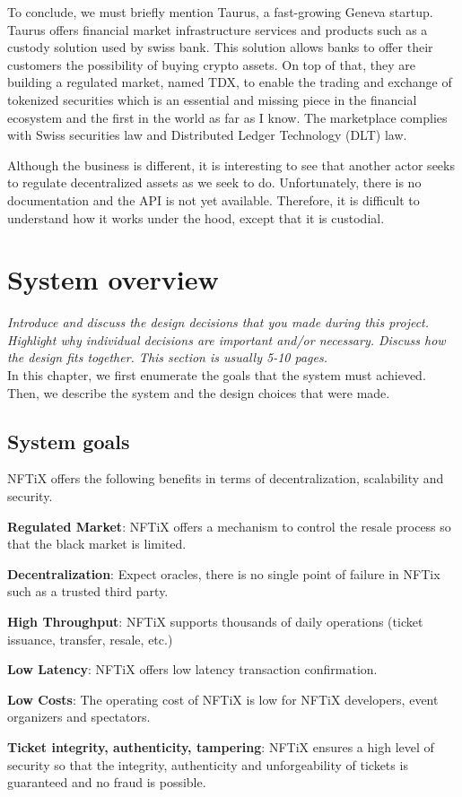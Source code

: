 \documentclass[a4paper,11pt,oneside]{report}
\begin{document}
To conclude, we must briefly mention Taurus, a fast-growing Geneva startup. Taurus offers financial market infrastructure services and products such as a custody solution used by swiss bank. This solution allows banks to offer their customers the possibility of buying crypto assets. On top of that, they are building a regulated market, named TDX, to enable the trading and exchange of tokenized securities which is an essential and missing piece in the financial ecosystem and the first in the world as far as I know. The marketplace complies with Swiss securities law and Distributed Ledger Technology (DLT) law.

Although the business is different, it is interesting to see that another actor seeks to regulate decentralized assets as we seek to do. Unfortunately, there is no documentation and the API is not yet available. Therefore, it is difficult to understand how it works under the hood, except that it is custodial.

\chapter{System overview}

\textit{Introduce and discuss the design decisions that you made during this project.
Highlight why individual decisions are important and/or necessary. Discuss
how the design fits together.
This section is usually 5-10 pages.} \\

In this chapter, we first enumerate the goals that the system must achieved. Then, we describe the system and the design choices that were made. 

\section{System goals}

NFTiX offers the following benefits in terms of decentralization, scalability and security.

\begin{description}
  \item \textbf{Regulated Market}: NFTiX offers a mechanism to control the resale process so that the black market is limited.
  \item \textbf{Decentralization}: Expect oracles, there is no single point of failure in NFTix such as a trusted third party.
  \item \textbf{High Throughput}: NFTiX supports thousands of daily operations (ticket issuance, transfer, resale, etc.)
  \item \textbf{Low Latency}: NFTiX offers low latency transaction confirmation.
  \item \textbf{Low Costs}: The operating cost of NFTiX is low for NFTiX developers, event organizers and spectators.
  \item \textbf{Ticket integrity, authenticity, tampering}: NFTiX ensures a high level of security so that the integrity, authenticity and unforgeability of tickets is guaranteed and no fraud is possible.
\end{description}
\end{document}
